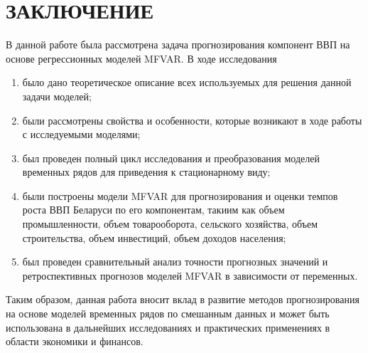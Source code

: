 \documentclass[a4paper, 14pt]{extreport}
\numberwithin{equation}{subsection}
\numberwithin{equation}{section}
\begin{document}
	\newpage
	\chapter*{ЗАКЛЮЧЕНИЕ}
	В данной работе была рассмотрена задача прогнозирования компонент ВВП на основе регрессионных моделей MFVAR. В ходе исследования
	\begin{enumerate}
		\item было дано теоретическое описание всех используемых для решения данной задачи моделей;
		\item были рассмотрены свойства и особенности, которые возникают в ходе работы с исследуемыми моделями;
		\item был проведен полный цикл исследования и преобразования моделей временных рядов для приведения к стационарному виду;
		\item были построены модели MFVAR для прогнозирования и оценки темпов роста ВВП Беларуси по его компонентам, такиим как объем промышленности, объем товарооборота, сельского хозяйства, объем строительства, объем инвестиций, объем доходов населения;
		\item был проведен сравнительный анализ точности прогнозных значений и ретроспективных прогнозов моделей MFVAR в зависимости от переменных.
	\end{enumerate}
	Таким образом, данная работа вносит вклад в развитие методов прогнозирования на основе моделей временных рядов по смешанным данных и
	может быть использована в дальнейших исследованиях и практических применениях в области экономики и финансов.
	\newpage
\end{document}
